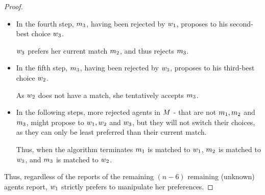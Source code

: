 \begin{proof}
\begin{itemize}
\item In the fourth step, $m_3$, having been rejected by  $w_1$, proposes to his second-best choice $w_3$.

$w_3$ prefers her current match $m_2$, and thus rejects $m_3$.


\item In the fifth step, $m_3$, having been rejected by  $w_3$, proposes to his third-best choice $w_2$.

As $w_2$ does not have a match, she tentatively accepts $m_3$.


\item In the following steps, more rejected agents in $M$ - that are not $m_1, m_2$ and $m_3$, might propose to $w_1, w_2$ and $w_3$, but they will not switch their choices, as they can only be least preferred than their current match. 

Thus, when the algorithm terminates $m_1$ is matched to $w_1$, $m_2$ is matched to $w_3$, and $m_3$ is matched to $w_2$. 
\end{itemize}


Thus, regardless of the reports of the remaining $(n-6)$ remaining (unknown) agents report, $w_1$ strictly prefers to manipulate her preferences.
\end{proof}

